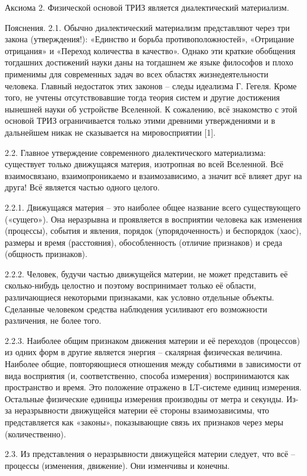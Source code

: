 \documentclass[11pt,a4paper]{article}
\begin{document}
 

Аксиома 2. Физической основой ТРИЗ является диалектический материализм.

Пояснения. 2.1. Обычно диалектический материализм представляют через три закона (утверждения!): «Единство и борьба противоположностей», «Отрицание отрицания» и «Переход количества в качество». Однако эти краткие обобщения тогдашних достижений науки даны на тогдашнем же языке философов и плохо применимы для современных задач во всех областях жизнедеятельности человека. Главный недостаток этих законов – следы идеализма Г. Гегеля. Кроме того, не учтены отсутствовавшие тогда теория систем и другие достижения нынешней науки об устройстве Вселенной. К сожалению, всё знакомство с этой основой ТРИЗ ограничивается только этими древними утверждениями и в дальнейшем никак не сказывается на мировосприятии [1].

2.2. Главное утверждение современного диалектического материализма: существует только движущаяся материя, изотропная во всей Вселенной. Всё взаимосвязано, взаимопроникаемо и взаимозависимо, а значит всё влияет друг на друга! Всё является частью одного целого.

2.2.1. Движущаяся материя – это наиболее общее название всего существующего («сущего»). Она неразрывна и проявляется в восприятии человека как изменения (процессы), события и явления, порядок (упорядоченность) и беспорядок (хаос), размеры и время (расстояния), обособленность (отличие признаков) и среда (общность признаков).

2.2.2. Человек, будучи частью движущейся материи, не может представить её сколько-нибудь целостно и поэтому воспринимает только её области, различающиеся некоторыми признаками, как условно отдельные объекты. Сделанные человеком средства наблюдения усиливают его возможности различения, не более того.

2.2.3. Наиболее общим признаком движения материи и её переходов (процессов) из одних форм в другие является энергия – скалярная физическая величина. Наиболее общие, повторяющиеся отношения между событиями в зависимости от вида восприятия (и, соответственно, способа измерения) воспринимаются как пространство и время. Это положение отражено в LT-системе единиц измерения. Остальные физические единицы измерения производны от метра и секунды. Из-за неразрывности движущейся материи её стороны взаимозависимы, что представляется как «законы», показывающие связь их признаков через меры (количественно).

2.3. Из представления о неразрывности движущейся материи следует, что всё – процессы (изменения, движение). Они изменчивы и конечны.
\end{document}
